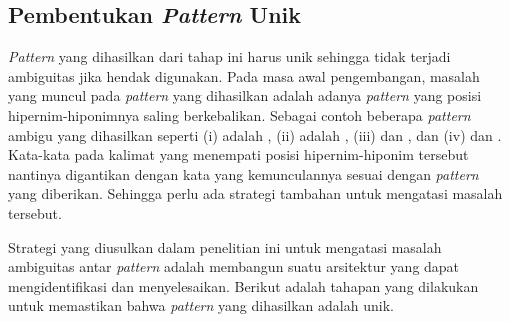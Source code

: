 \subsection{Pembentukan \textit{Pattern} Unik}
\textit{Pattern} yang dihasilkan dari tahap ini harus unik sehingga tidak terjadi ambiguitas jika hendak digunakan. Pada masa awal pengembangan, masalah yang muncul pada \textit{pattern} yang dihasilkan adalah adanya \textit{pattern} yang posisi hipernim-hiponimnya saling berkebalikan. Sebagai contoh beberapa \textit{pattern} ambigu yang dihasilkan seperti (i) {\tagHyponym} adalah {\tagHypernym}, (ii) {\tagHypernym} adalah {\tagHyponym}, (iii) {\tagHypernym} dan {\tagHyponym}, dan (iv) {\tagHyponym} dan {\tagHypernym}. Kata-kata pada kalimat yang menempati posisi hipernim-hiponim tersebut nantinya digantikan dengan kata yang kemunculannya sesuai dengan \textit{pattern} yang diberikan. Sehingga perlu ada strategi tambahan untuk mengatasi masalah tersebut.

Strategi yang diusulkan dalam penelitian ini untuk mengatasi masalah ambiguitas antar \textit{pattern} adalah membangun suatu arsitektur yang dapat mengidentifikasi dan menyelesaikan. Berikut adalah tahapan yang dilakukan untuk memastikan bahwa \textit{pattern} yang dihasilkan adalah unik.

